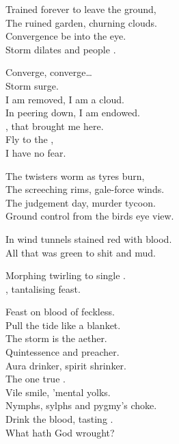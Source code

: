 
Trained forever to leave the ground, \\
The ruined garden, churning clouds. \\
Convergence be into the eye. \\
Storm dilates and people . \\


Converge, converge… \\
Storm surge. \\

I am removed, I am a cloud. \\
In peering down, I am endowed. \\
, that brought me here. \\
Fly to the , \\
I have no fear. \\


The twisters worm as tyres burn, \\
The screeching rims, gale-force winds. \\
The judgement day, murder tycoon. \\
Ground control from the birds eye view. \\


In wind tunnels stained red with blood. \\
All that was green to shit and mud. \\


Morphing twirling to single . \\
, tantalising feast. \\


Feast on blood of feckless. \\
Pull the tide like a blanket. \\

The storm is the aether. \\
Quintessence and preacher. \\
Aura drinker, spirit shrinker. \\
The one true . \\
Vile smile, 'mental yolks. \\
Nymphs, sylphs and pygmy's choke. \\
Drink the blood, tasting . \\
What hath God wrought? \\

